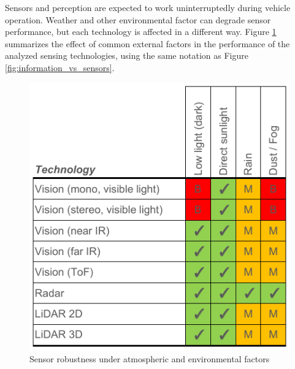 Sensors and perception are expected to work uninterruptedly during vehicle 
operation. Weather and other environmental factor can degrade sensor
performance, but each technology is affected in a different way. 
Figure \ref{fig:sensors-environ} summarizes the effect of common external
factors in the performance of the analyzed sensing technologies, using the
same notation as Figure \ref{fig:information_vs_sensors}.

\begin{figure}[h]
\centering
\includegraphics[width=0.68\linewidth]{"img/sensors_atmospheric_conditions"}
\caption{Sensor robustness under atmospheric and environmental factors}
\label{fig:sensors-environ}
\end{figure}

%

